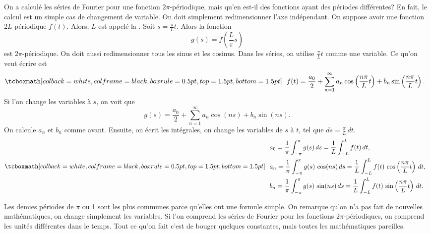 On a calculé les séries de Fourier pour une fonction $2\pi$-périodique, mais qu'en est-il des fonctions ayant des périodes différentes? En fait, le calcul est un simple cas de changement de variable. On doit simplement  redimensionner l'axe indépendant. On suppose avoir une fonction  $2L$-périodique $f(t)$.  Alors, $L$ est appelé la  \emph{}.  Soit $s = \frac{\pi}{L}  t$.
Alors la fonction
\begin{equation*}
g(s) = f\left(\frac{L}{\pi} s \right)
\end{equation*}
est $2\pi$-périodique.  On doit aussi redimensionner tous les sinus et les cosinus. Dans les séries, on utilise $\frac{\pi}{L} t$ comme une variable. Ce qu'on veut écrire est
\begin{equation*}
\mybxbg{~~
f(t) = 
\frac{a_0}{2} +
\sum_{n=1}^\infty a_n \cos \left( \frac{n \pi}{L} t \right)
+ b_n \sin \left(\frac{n \pi}{L} t \right) .
~~}
\end{equation*}
Si l'on change les variables à $s$, on voit que 
\begin{equation*}
g(s) = 
\frac{a_0}{2} +
\sum_{n=1}^\infty a_n \cos (n s)
+ b_n \sin (n s) .
\end{equation*}
On calcule $a_n$ et $b_n$ comme avant.  Ensuite, on écrit les intégrales, on change les variables de $s$ à $t$, tel que $ds = \frac{\pi}{L} \, dt$.
\begin{equation*}
\mybxbg{~~
\begin{aligned}
& a_0 =
\frac{1}{\pi}
\int_{-\pi}^\pi
g(s) \, ds
=
\frac{1}{L}
\int_{-L}^L
f(t) \, dt , \\
& a_n =
\frac{1}{\pi}
\int_{-\pi}^\pi
g(s) \, \cos (n s) \, ds
=
\frac{1}{L}
\int_{-L}^L
f(t) \, \cos \left( \frac{n \pi}{L} t \right) \, dt , \\
& b_n =
\frac{1}{\pi}
\int_{-\pi}^\pi
g(s) \, \sin (n s) \, ds
=
\frac{1}{L}
\int_{-L}^L
f(t) \, \sin \left( \frac{n \pi}{L} t \right) \, dt .
\end{aligned}
~~}
\end{equation*}

Les demies périodes de $\pi$ ou 1 sont les plus communes parce qu'elles ont une formule simple. On remarque qu'on n'a pas fait de nouvelles mathématiques, on change simplement les variables. Si l'on comprend les séries de Fourier pour les fonctions  $2\pi$-périodiques, on comprend les unités différentes dans le temps. Tout ce qu'on fait c'est de bouger quelques constantes, mais toutes les mathématiques pareilles.  

